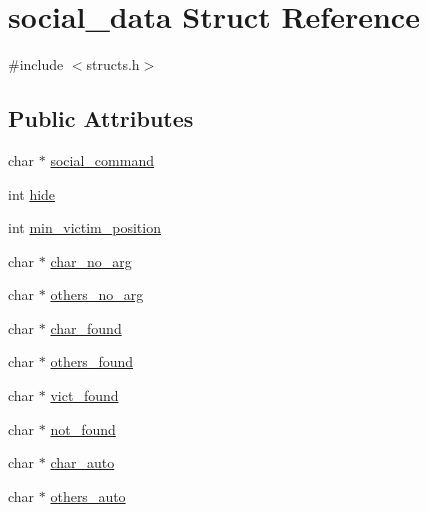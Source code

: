 \hypertarget{structsocial__data}{\section{social\-\_\-data Struct Reference}
\label{structsocial__data}
}


{\ttfamily \#include $<$structs.\-h$>$}

\subsection*{Public Attributes}
\begin{DoxyCompactItemize}
\item 
char $\ast$ \hyperlink{structsocial__data_aa2e08ab3910f10ca9e8bae5229a39a43}{social\-\_\-command}
\item 
int \hyperlink{structsocial__data_a955ff9a01fe8536aa9e7aac0e27f9efe}{hide}
\item 
int \hyperlink{structsocial__data_abc850bea2b43c9a09bb9a7bffbb7b13a}{min\-\_\-victim\-\_\-position}
\item 
char $\ast$ \hyperlink{structsocial__data_a42c237da0a34db1dc19078721d0f5dc5}{char\-\_\-no\-\_\-arg}
\item 
char $\ast$ \hyperlink{structsocial__data_a361811d70b7309e8c3ee782688a06ce6}{others\-\_\-no\-\_\-arg}
\item 
char $\ast$ \hyperlink{structsocial__data_a0cc1c488655ea7258d2cd238f7b89013}{char\-\_\-found}
\item 
char $\ast$ \hyperlink{structsocial__data_a2cc7800d9ac6d3e466c04811ef63c226}{others\-\_\-found}
\item 
char $\ast$ \hyperlink{structsocial__data_a9a6909611ff90a480d9022a1213836d8}{vict\-\_\-found}
\item 
char $\ast$ \hyperlink{structsocial__data_af70dc6853546bea3ef1262408de33344}{not\-\_\-found}
\item 
char $\ast$ \hyperlink{structsocial__data_ae2fb50f15489ee289e2f348c39968676}{char\-\_\-auto}
\item 
char $\ast$ \hyperlink{structsocial__data_a899d804a80721c480bf8f997e9fa8453}{others\-\_\-auto}
\end{DoxyCompactItemize}


